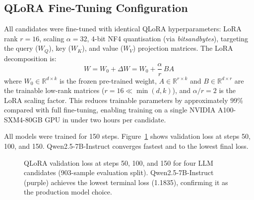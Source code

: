 \documentclass{article}
\begin{document}
\FloatBarrier
\subsection{QLoRA Fine-Tuning Configuration}

All candidates were fine-tuned with identical QLoRA hyperparameters:
LoRA rank $r = 16$, scaling $\alpha = 32$, 4-bit NF4 quantisation
(via \textit{bitsandbytes}), targeting the query ($W_Q$), key ($W_K$),
and value ($W_V$) projection matrices.
The LoRA decomposition is:
\begin{equation}
W = W_0 + \Delta W = W_0 + \frac{\alpha}{r}\,BA
\label{eq:lora}
\end{equation}
where $W_0 \in \mathbb{R}^{d \times k}$ is the frozen pre-trained weight,
$A \in \mathbb{R}^{r \times k}$ and $B \in \mathbb{R}^{d \times r}$ are the
trainable low-rank matrices ($r = 16 \ll \min(d, k)$), and
$\alpha / r = 2$ is the LoRA scaling factor.
This reduces trainable parameters by approximately 99\% compared with
full fine-tuning, enabling training on a single NVIDIA A100-SXM4-80GB GPU
in under two hours per candidate.

All models were trained for 150 steps.
Figure~\ref{fig:llm_curves} shows validation loss at steps 50, 100, and 150.
Qwen2.5-7B-Instruct converges fastest and to the lowest final loss.

\begin{figure}[htbp]
\centering
{}
\caption{QLoRA validation loss at steps 50, 100, and 150 for four LLM
         candidates (903-sample evaluation split).
         Qwen2.5-7B-Instruct (purple) achieves the lowest terminal loss
         (1.1835), confirming it as the production model choice.}
\label{fig:llm_curves}
\end{figure}
\end{document}
